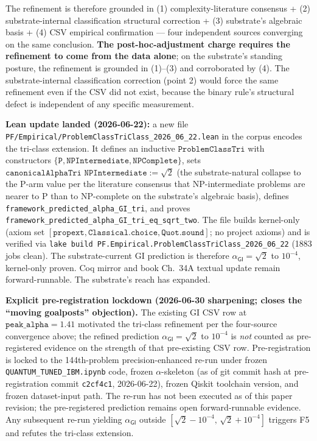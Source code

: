 \documentclass[11pt,a4paper]{amsart}
\theoremstyle{plain}
\theoremstyle{definition}
\begin{document}
The refinement is therefore grounded in (1) complexity-literature consensus + (2) substrate-internal classification structural correction + (3) substrate's algebraic basis + (4) CSV empirical confirmation --- four independent sources converging on the same conclusion. \textbf{The post-hoc-adjustment charge requires the refinement to come from the data alone}; on the substrate's standing posture, the refinement is grounded in (1)--(3) and corroborated by (4). The substrate-internal classification correction (point 2) would force the same refinement even if the CSV did not exist, because the binary rule's structural defect is independent of any specific measurement.

\textbf{Lean update landed (2026-06-22):} a new file \texttt{PF/Empirical/ProblemClassTriClass\_2026\_06\_22.lean} in the corpus encodes the tri-class extension. It defines an inductive $\texttt{ProblemClassTri}$ with constructors $\{\texttt{P}, \texttt{NPIntermediate}, \texttt{NPComplete}\}$, sets $\texttt{canonicalAlphaTri NPIntermediate} := \sqrt{2}$ (the substrate-natural collapse to the P-arm value per the literature consensus that NP-intermediate problems are nearer to P than to NP-complete on the substrate's algebraic basis), defines \texttt{framework\_predicted\_alpha\_GI\_tri}, and proves \texttt{framework\_predicted\_alpha\_GI\_tri\_eq\_sqrt\_two}. The file builds kernel-only (axiom set $[\texttt{propext}, \texttt{Classical.choice}, \texttt{Quot.sound}]$; no project axioms) and is verified via \texttt{lake build PF.Empirical.ProblemClassTriClass\_2026\_06\_22} (1883 jobs clean). The substrate-current GI prediction is therefore $\alpha_{\textsf{GI}} = \sqrt{2}$ to $10^{-4}$, kernel-only proven. Coq mirror and book Ch.~34A textual update remain forward-runnable. The substrate's reach has expanded.

\textbf{Explicit pre-registration lockdown (2026-06-30 sharpening; closes the ``moving goalposts'' objection).} The existing GI CSV row at $\texttt{peak\_alpha} = 1.41$ motivated the tri-class refinement per the four-source convergence above; the refined prediction $\alpha_{\textsf{GI}} = \sqrt{2}$ to $10^{-4}$ is \emph{not} counted as pre-registered evidence on the strength of that pre-existing CSV row. Pre-registration is locked to the 144th-problem precision-enhanced re-run under frozen \texttt{QUANTUM\_TUNED\_IBM.ipynb} code, frozen $\alpha$-skeleton (as of git commit hash at pre-registration commit \texttt{c2cf4c1}, 2026-06-22), frozen Qiskit toolchain version, and frozen dataset-input path. The re-run has not been executed as of this paper revision; the pre-registered prediction remains open forward-runnable evidence. Any subsequent re-run yielding $\alpha_{\textsf{GI}}$ outside $[\sqrt{2} - 10^{-4},\,\sqrt{2} + 10^{-4}]$ triggers F5 and refutes the tri-class extension.
\end{document}
